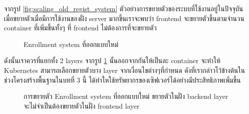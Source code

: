 จากรูป \ref{fig:scaling_old_regist_system} ตัวอย่างการขยายตัวของระบบที่ใช้งานอยู่ในปัจจุบันเมื่อขยายตัวเมื่อมีการใช้งานของฝั่ง server มากขึ้นเราจะพบว่า frontend จะขยายตัวขึ้นตามจำนวน container ที่เพิ่มขึ้นทั้งๆ ที่ frontend ไม่ต้องการที่จะขยายตัว

\begin{figure}[h]
    \centering
    \begin{center}
    \end{center}
    \caption[Poem]{Enrollment system ที่ออกแบบใหม่}
    \label{fig:new_regist_system}
\end{figure}

ดังนั้นเราควรที่แยกทั้ง 2 layers จากรูป \ref{fig:new_regist_system} นั้นออกจากกันให้เป็นละ container จะทำให้ Kubernetes สามารถเลือกขยายตัวบาง layer จากเงื่อนไขต่างๆที่กำหนด ดังที่เรากล่าวไว้ข้างต้นในช่วงโครงสร้างพื้นฐานในบทที่ 3 นี้ ได้ทำใหใช้ทรัพยากรของเซิฟเวอร์ได้อย่างมีประสิทธิภาพเพิ่มขึ้น

\begin{figure}[h]
    \centering
    \begin{center}
    \end{center}
    \caption[Poem]{การขยายตัว Enrollment system ที่ออกแบบใหม่ ขยายตัวในฝั่ง backend layer จะไม่จำเป็นต้องขยายตัวในฝั่ง frontend layer}
    \label{fig:scaling_new_regist_system}
\end{figure}

